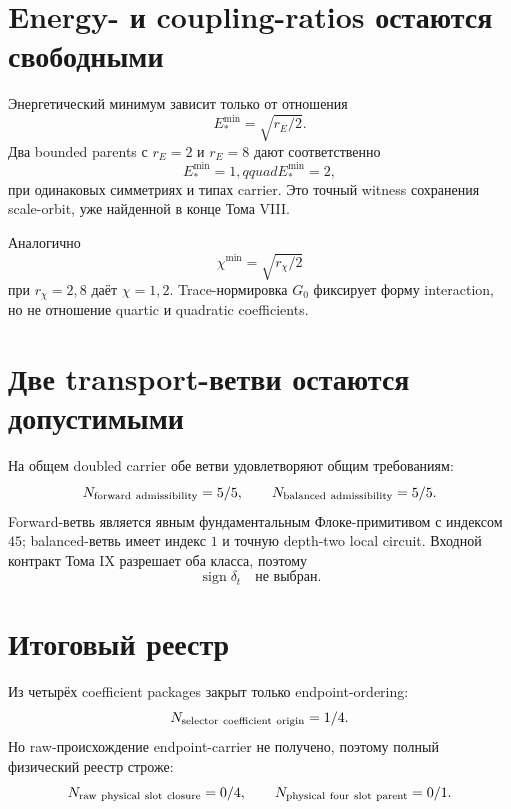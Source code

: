 \section{Energy- и coupling-ratios остаются свободными}

Энергетический минимум зависит только от отношения
\begin{equation}
 E_*^{\min}=\sqrt{r_E/2}.
 \label{eq:v9-origin-energy-ratio}
\end{equation}
Два bounded parents с $r_E=2$ и $r_E=8$ дают соответственно
\begin{equation}
 E_*^{\min}=1,qquad E_*^{\min}=2,
 \label{eq:v9-origin-energy-witnesses}
\end{equation}
при одинаковых симметриях и типах carrier. Это точный witness сохранения
scale-orbit, уже найденной в конце Тома VIII.

Аналогично
\begin{equation}
 \chi^{\min}=\sqrt{r_\chi/2}
 \label{eq:v9-origin-coupling-ratio}
\end{equation}
при $r_\chi=2,8$ даёт $\chi=1,2$. Trace-нормировка $G_0$ фиксирует форму
interaction, но не отношение quartic и quadratic coefficients.

\section{Две transport-ветви остаются допустимыми}

На общем doubled carrier обе ветви удовлетворяют общим требованиям:
\begin{equation}
 N_{\rm forward\ admissibility}=5/5,
 \qquad N_{\rm balanced\ admissibility}=5/5.
 \label{eq:v9-origin-transport-admissibility}
\end{equation}
Forward-ветвь является явным фундаментальным Флоке-примитивом с индексом
$45$; balanced-ветвь имеет индекс $1$ и точную depth-two local circuit.
Входной контракт Тома IX разрешает оба класса, поэтому
\begin{equation}
 \operatorname{sign}\delta_t\quad\text{не выбран}.
 \label{eq:v9-origin-transport-bias}
\end{equation}

\section{Итоговый реестр}

Из четырёх coefficient packages закрыт только endpoint-ordering:
\begin{equation}
 N_{\rm selector\ coefficient\ origin}=1/4.
 \label{eq:v9-origin-coefficient-ledger}
\end{equation}
Но raw-происхождение endpoint-carrier не получено, поэтому полный
физический реестр строже:
\begin{equation}
 N_{\rm raw\ physical\ slot\ closure}=0/4,
 \qquad N_{\rm physical\ four\ slot\ parent}=0/1.
 \label{eq:v9-origin-physical-ledger}
\end{equation}

